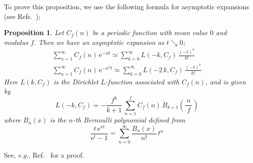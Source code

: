 \documentclass[12pt,reqno]{amsart}
\numberwithin{equation}{section}
\newtheorem{prop}[theorem]{Proposition}
\begin{document}
To prove this proposition, we use the following formula for asymptotic expansions
(see Refs.~);
\begin{prop}
  \label{prop:L_function}
  Let $C_f(n)$ be a periodic function with mean value $0$ and modulus $f$.
  Then we have an  asymptotic expansion  as $t \searrow 0$;
  \begin{gather}
    \sum_{n=1}^\infty C_f(n) \, \mathrm{e}^{-n   t}
    \simeq
    \sum_{k=0}^\infty
    L(- k, C_f) \,
    \frac{(-t)^k}{k!} 
    \\[2mm]
%
    \sum_{n=1}^\infty C_f(n) \, \mathrm{e}^{-n^2  t}
    \simeq
    \sum_{k=0}^\infty
    L(-2 \, k, C_f) \,
    \frac{(-t)^k}{k!} 
  \end{gather}
  Here
  $L(k,C_f)$ is the Dirichlet $L$-function associated with $C_f(n)$,
  and is given by
  \begin{equation*}
    L(-k, C_f)
    =
    - \frac{f^k}{k+1} \,
    \sum_{n=1}^f
    C_f(n) \, B_{k+1} \left( \frac{\ n \ }{f} \right) 
  \end{equation*}
  where
  $B_n(x)$ is the $n$-th Bernoulli polynomial defined from
  \begin{equation*}
    \frac{
      t \, \mathrm{e}^{x t}
    }{
      \mathrm{e}^t -1
    }
    =
    \sum_{n=0}^\infty
    \frac{B_n(x)}{n!} \,
    t^n
  \end{equation*}
\end{prop}

See, \emph{e.g.}, Ref.~ for a proof.
\end{document}
